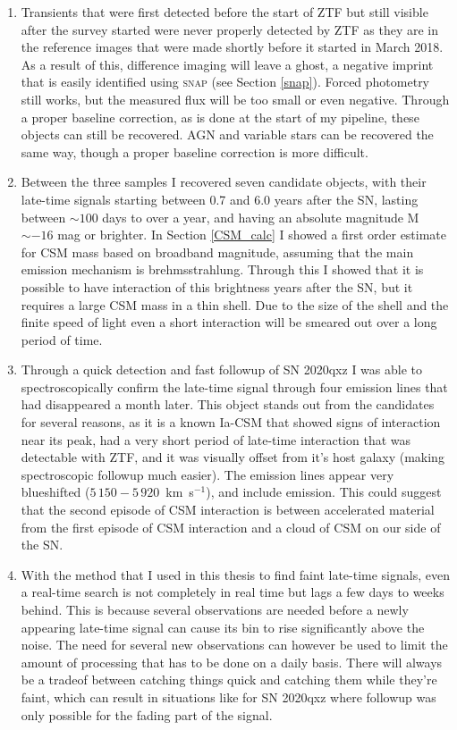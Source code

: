 \documentclass[a4paper,oneside,12pt, class=Latex/Classes/PhDthesisPSnPDF, crop=false]{standalone}
\begin{document}
\begin{enumerate}
	\item Transients that were first detected before the start of ZTF but still visible after the survey started were never properly detected by ZTF as they are in the reference images that were made shortly before it started in March 2018. As a result of this, difference imaging will leave a ghost, a negative imprint that is easily identified using \textsc{snap} (see Section \ref{snap}). Forced photometry still works, but the measured flux will be too small or even negative. Through a proper baseline correction, as is done at the start of my pipeline, these objects can still be recovered. AGN and variable stars can be recovered the same way, though a proper baseline correction is more difficult.
	\item Between the three samples I recovered seven candidate objects, with their late-time signals starting between 0.7 and 6.0 years after the SN, lasting between $\sim100$ days to over a year, and having an absolute magnitude M$\sim-16$ mag or brighter. In Section \ref{CSM_calc} I showed a first order estimate for CSM mass based on broadband magnitude, assuming that the main emission mechanism is brehmsstrahlung. Through this I showed that it is possible to have interaction of this brightness years after the SN, but it requires a large CSM mass in a thin shell. Due to the size of the shell and the finite speed of light even a short interaction will be smeared out over a long period of time.
	\item Through a quick detection and fast followup of SN 2020qxz I was able to spectroscopically confirm the late-time signal through four emission lines that had disappeared a month later. This object stands out from the candidates for several reasons, as it is a known Ia-CSM that showed signs of interaction near its peak, had a very short period of late-time interaction that was detectable with ZTF, and it was visually offset from it's host galaxy (making spectroscopic followup much easier). The emission lines appear very blueshifted ($5\,150 - 5\,920$~km~s$^{-1}$), and include \Hbeta emission. This could suggest that the second episode of CSM interaction is between accelerated material from the first episode of CSM interaction and a cloud of CSM on our side of the SN.
	\item With the method that I used in this thesis to find faint late-time signals, even a real-time search is not completely in real time but lags a few days to weeks behind. This is because several observations are needed before a newly appearing late-time signal can cause its bin to rise significantly above the noise. The need for several new observations can however be used to limit the amount of processing that has to be done on a daily basis. There will always be a tradeof between catching things quick and catching them while they're faint, which can result in situations like for SN 2020qxz where followup was only possible for the fading part of the signal.

\end{enumerate}
\end{document}
